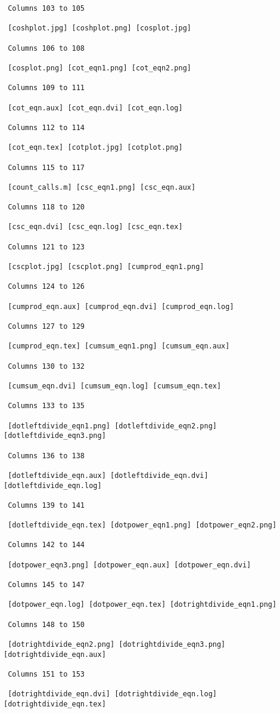 \begin{verbatim}
 Columns 103 to 105

 [coshplot.jpg] [coshplot.png] [cosplot.jpg] 

 Columns 106 to 108

 [cosplot.png] [cot_eqn1.png] [cot_eqn2.png] 

 Columns 109 to 111

 [cot_eqn.aux] [cot_eqn.dvi] [cot_eqn.log] 

 Columns 112 to 114

 [cot_eqn.tex] [cotplot.jpg] [cotplot.png] 

 Columns 115 to 117

 [count_calls.m] [csc_eqn1.png] [csc_eqn.aux] 

 Columns 118 to 120

 [csc_eqn.dvi] [csc_eqn.log] [csc_eqn.tex] 

 Columns 121 to 123

 [cscplot.jpg] [cscplot.png] [cumprod_eqn1.png] 

 Columns 124 to 126

 [cumprod_eqn.aux] [cumprod_eqn.dvi] [cumprod_eqn.log] 

 Columns 127 to 129

 [cumprod_eqn.tex] [cumsum_eqn1.png] [cumsum_eqn.aux] 

 Columns 130 to 132

 [cumsum_eqn.dvi] [cumsum_eqn.log] [cumsum_eqn.tex] 

 Columns 133 to 135

 [dotleftdivide_eqn1.png] [dotleftdivide_eqn2.png] [dotleftdivide_eqn3.png] 

 Columns 136 to 138

 [dotleftdivide_eqn.aux] [dotleftdivide_eqn.dvi] [dotleftdivide_eqn.log] 

 Columns 139 to 141

 [dotleftdivide_eqn.tex] [dotpower_eqn1.png] [dotpower_eqn2.png] 

 Columns 142 to 144

 [dotpower_eqn3.png] [dotpower_eqn.aux] [dotpower_eqn.dvi] 

 Columns 145 to 147

 [dotpower_eqn.log] [dotpower_eqn.tex] [dotrightdivide_eqn1.png] 

 Columns 148 to 150

 [dotrightdivide_eqn2.png] [dotrightdivide_eqn3.png] [dotrightdivide_eqn.aux] 

 Columns 151 to 153

 [dotrightdivide_eqn.dvi] [dotrightdivide_eqn.log] [dotrightdivide_eqn.tex] 


\end{verbatim}
